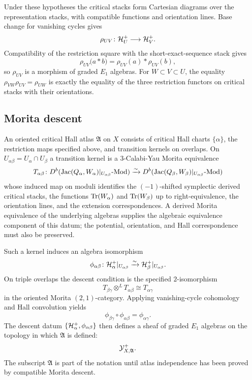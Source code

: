 Under these hypotheses the critical stacks form Cartesian diagrams over
the representation stacks, with compatible functions and orientation
lines.  Base change for vanishing cycles gives
\[
  \rho_{UV}\colon \mathcal H_{U}^{+}\longrightarrow \mathcal H_{V}^{+}.
\]
Compatibility of the restriction square with the short-exact-sequence
stack gives
\[
  \rho_{UV}\bigl(a*b\bigr)=\rho_{UV}(a)*\rho_{UV}(b),
\]
so $\rho_{UV}$ is a morphism of graded $E_1$ algebras.  For
$W\subset V\subset U$, the equality
$\rho_{VW}\rho_{UV}=\rho_{UW}$ is exactly the equality of the three
restriction functors on critical stacks with their orientations.

\subsection*{Morita descent}

An oriented critical Hall atlas $\mathfrak A$ on $X$ consists of
critical Hall charts $\{\alpha\}$, the restriction maps specified above,
and transition kernels on overlaps.  On
$U_{\alpha\beta}=U_{\alpha}\cap U_{\beta}$ a transition kernel is a
$3$-Calabi-Yau Morita equivalence
\[
  T_{\alpha\beta}\colon
  D^{b}(\mathrm{Jac}(Q_{\alpha},W_{\alpha})|_{U_{\alpha\beta}}\text{-}\mathrm{Mod})
  \xrightarrow{\sim}
  D^{b}(\mathrm{Jac}(Q_{\beta},W_{\beta})|_{U_{\alpha\beta}}\text{-}\mathrm{Mod})
\]
whose induced map on moduli identifies the $(-1)$-shifted symplectic
derived critical stacks, the functions $\mathrm{Tr}(W_{\alpha})$ and
$\mathrm{Tr}(W_{\beta})$ up to right-equivalence, the orientation lines, and the
extension correspondences.  A derived Morita equivalence of the
underlying algebras supplies the algebraic equivalence component of
this datum; the potential, orientation, and Hall correspondence must
also be preserved.

Such a kernel induces an algebra isomorphism
\[
  \phi_{\alpha\beta}\colon
  \mathcal H_{\alpha}^{+}|_{U_{\alpha\beta}}
  \xrightarrow{\sim}
  \mathcal H_{\beta}^{+}|_{U_{\alpha\beta}}.
\]
On triple overlaps the descent condition is the specified
$2$-isomorphism
\[
  T_{\beta\gamma}\otimes^{L}T_{\alpha\beta}
  \cong
  T_{\alpha\gamma}
\]
in the oriented Morita $(2,1)$-category.  Applying vanishing-cycle
cohomology and Hall convolution yields
\[
  \phi_{\beta\gamma}\circ\phi_{\alpha\beta}
  =
  \phi_{\alpha\gamma}.
\]
The descent datum $\{\mathcal H_{\alpha}^{+},\phi_{\alpha\beta}\}$ then defines
a sheaf of graded $E_1$ algebras on the topology in which
$\mathfrak A$ is defined:
\[
  \mathcal Y^{+}_{X,\mathfrak A}.
\]
The subscript $\mathfrak A$ is part of the notation until atlas
independence has been proved by compatible Morita descent.

